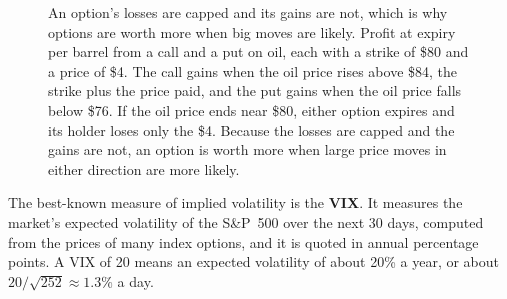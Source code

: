 \begin{figure}[htbp]
\centering
{}
\caption{An option's losses are capped and its gains are not, which is why options are worth more when big moves are likely. Profit at expiry per barrel from a call and a put on oil, each with a strike of \$80 and a price of \$4. The call gains when the oil price rises above \$84, the strike plus the price paid, and the put gains when the oil price falls below \$76. If the oil price ends near \$80, either option expires and its holder loses only the \$4. Because the losses are capped and the gains are not, an option is worth more when large price moves in either direction are more likely.}
\label{fig:10-option-payoff}
\end{figure}


The best-known measure of implied volatility is the \textbf{VIX}. It measures the market's expected volatility of the S\&P~500 over the next 30 days, computed from the prices of many index options, and it is quoted in annual percentage points. A VIX of 20 means an expected volatility of about 20\% a year, or about $20/\sqrt{252} \approx 1.3\%$ a day.

